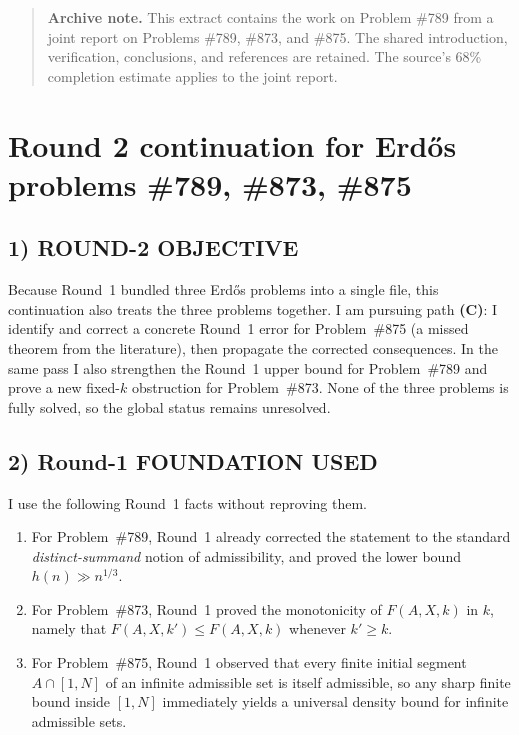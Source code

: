 \begin{quote}
\textbf{Archive note.} This extract contains the work on Problem \#789 from a joint report on Problems \#789, \#873, and \#875. The shared introduction, verification, conclusions, and references are retained. The source's 68\% completion estimate applies to the joint report.
\end{quote}

\section{Round 2 continuation for Erd\H{o}s problems \#789, \#873, \#875}

\subsection*{1) ROUND-2 OBJECTIVE}

Because Round~1 bundled three Erd\H{o}s problems into a single file, this continuation also treats the three problems together. I am pursuing path \textbf{(C)}: I identify and correct a concrete Round~1 error for Problem~\#875 (a missed theorem from the literature), then propagate the corrected consequences. In the same pass I also strengthen the Round~1 upper bound for Problem~\#789 and prove a new fixed-\(k\) obstruction for Problem~\#873. None of the three problems is fully solved, so the global status remains unresolved.

\subsection*{2) Round-1 FOUNDATION USED}

I use the following Round~1 facts without reproving them.

\begin{enumerate}
\item For Problem~\#789, Round~1 already corrected the statement to the standard \emph{distinct-summand} notion of admissibility, and proved the lower bound \(h(n) \gg n^{1/3}\).
\item For Problem~\#873, Round~1 proved the monotonicity of \(F(A,X,k)\) in \(k\), namely that \(F(A,X,k') \le F(A,X,k)\) whenever \(k'\ge k\).
\item For Problem~\#875, Round~1 observed that every finite initial segment \(A\cap [1,N]\) of an infinite admissible set is itself admissible, so any sharp finite bound inside \([1,N]\) immediately yields a universal density bound for infinite admissible sets.
\end{enumerate}

